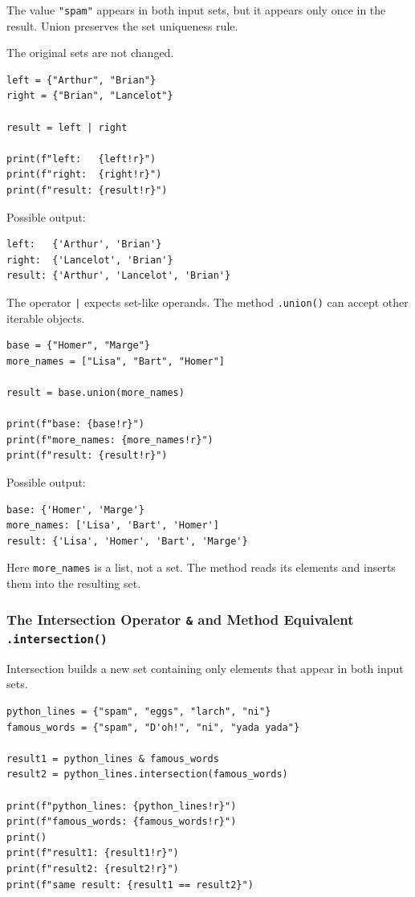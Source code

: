 The value \texttt{"spam"} appears in both input sets, but it appears only once in the result. Union preserves the set uniqueness rule.

The original sets are not changed.

\begin{verbatim}
left = {"Arthur", "Brian"}
right = {"Brian", "Lancelot"}

result = left | right

print(f"left:   {left!r}")
print(f"right:  {right!r}")
print(f"result: {result!r}")
\end{verbatim}

Possible output:

\begin{verbatim}
left:   {'Arthur', 'Brian'}
right:  {'Lancelot', 'Brian'}
result: {'Arthur', 'Lancelot', 'Brian'}
\end{verbatim}

The operator \texttt{|} expects set-like operands. The method \texttt{.union()} can accept other iterable objects.

\begin{verbatim}
base = {"Homer", "Marge"}
more_names = ["Lisa", "Bart", "Homer"]

result = base.union(more_names)

print(f"base: {base!r}")
print(f"more_names: {more_names!r}")
print(f"result: {result!r}")
\end{verbatim}

Possible output:

\begin{verbatim}
base: {'Homer', 'Marge'}
more_names: ['Lisa', 'Bart', 'Homer']
result: {'Lisa', 'Homer', 'Bart', 'Marge'}
\end{verbatim}

Here \texttt{more\_names} is a list, not a set. The method reads its elements and inserts them into the resulting set.

\subsubsection{The Intersection Operator \texttt{\&} and Method Equivalent \texttt{.intersection()}}

Intersection builds a new set containing only elements that appear in both input sets.

\begin{verbatim}
python_lines = {"spam", "eggs", "larch", "ni"}
famous_words = {"spam", "D'oh!", "ni", "yada yada"}

result1 = python_lines & famous_words
result2 = python_lines.intersection(famous_words)

print(f"python_lines: {python_lines!r}")
print(f"famous_words: {famous_words!r}")
print()
print(f"result1: {result1!r}")
print(f"result2: {result2!r}")
print(f"same result: {result1 == result2}")
\end{verbatim}


